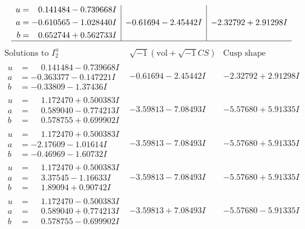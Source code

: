 \documentclass[1p]{elsarticle_modified}
\theoremstyle{definition}
\newcommand{\I}{\sqrt{-1}}
\begin{document}
$$\begin{array}{c|c|c}
\begin{aligned}
u &= \phantom{-}0.141484 - 0.739668 I \\
a &= -0.610565 - 1.028440 I \\
b &= \phantom{-}0.652744 + 0.562733 I\end{aligned}
 & -0.61694 - 2.45442 I & -2.32792 + 2.91298 I\\
 \hline 
 \end{array}$$\newpage$$\begin{array}{c|c|c}  
\text{Solutions to }I^u_{2}& \I (\text{vol} + \sqrt{-1}CS) & \text{Cusp shape}\\
 \hline 
\begin{aligned}
u &= \phantom{-}0.141484 - 0.739668 I \\
a &= -0.363377 - 0.147221 I \\
b &= -0.33809 - 1.37436 I\end{aligned}
 & -0.61694 - 2.45442 I & -2.32792 + 2.91298 I \\ \hline\begin{aligned}
u &= \phantom{-}1.172470 + 0.500383 I \\
a &= \phantom{-}0.589040 - 0.774213 I \\
b &= \phantom{-}0.578755 + 0.699902 I\end{aligned}
 & -3.59813 - 7.08493 I & -5.57680 + 5.91335 I \\ \hline\begin{aligned}
u &= \phantom{-}1.172470 + 0.500383 I \\
a &= -2.17609 - 1.01614 I \\
b &= -0.46969 - 1.60732 I\end{aligned}
 & -3.59813 - 7.08493 I & -5.57680 + 5.91335 I \\ \hline\begin{aligned}
u &= \phantom{-}1.172470 + 0.500383 I \\
a &= \phantom{-}3.37545 - 1.16633 I \\
b &= \phantom{-}1.89094 + 0.90742 I\end{aligned}
 & -3.59813 - 7.08493 I & -5.57680 + 5.91335 I \\ \hline\begin{aligned}
u &= \phantom{-}1.172470 - 0.500383 I \\
a &= \phantom{-}0.589040 + 0.774213 I \\
b &= \phantom{-}0.578755 - 0.699902 I\end{aligned}
 & -3.59813 + 7.08493 I & -5.57680 - 5.91335 I \\ \hline\begin{aligned}

\end{aligned}
\end{array}$$
\end{document}
